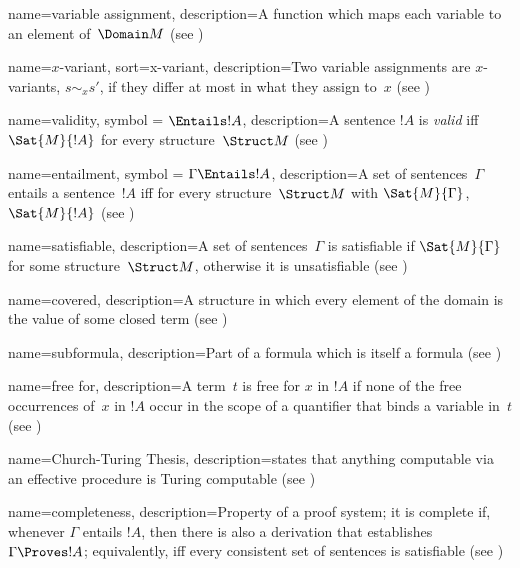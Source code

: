  {
  name=variable assignment,  
  description={A \gls{function} which maps each {variable} to an element
    of~$\Domain M$ (see )} }

 {
  name=$x$-variant,
  sort={x-variant},
  description={Two \glspl{variable assignment} are $x$-variants, $s \sim_x
    s'$, if they differ at most in what they assign to~$x$ (see
    )} }

 {
  name=validity,
  symbol = {\ensuremath{\Entails !A}},
  description={A sentence $!A$ is \emph{valid}  iff
    $\Sat{M}{!A}$ for every \gls{structure}~$\Struct M$ (see
    )} }

 {
  name=entailment,
  symbol = {\ensuremath{\Gamma \Entails !A}},
  description={A set of sentences~$\Gamma$ entails a
    sentence~$!A$ iff for every
    \gls{structure}~$\Struct M$ with $\Sat{M}{\Gamma}$, $\Sat{M}{!A}$
    (see )} }

 {
  name=satisfiable,
  description={A set of sentences~$\Gamma$ is satisfiable if
    $\Sat{M}{\Gamma}$ for some \gls{structure}~$\Struct M$, otherwise it
    is unsatisfiable (see )} }

 {
    name=covered,    
    description={A \gls{structure} in which every element of the
      domain is the {value} of some closed term (see
      )} }

 {
  name={subformula},  
  description={Part of a formula which is itself a formula (see
    )} }

 {
  name=free for,
  description={A term~$t$ is {free for} $x$ in $!A$ if none
    of the \gls{free} occurrences of~$x$ in $!A$ occur in the scope of a
    quantifier that binds a variable in~$t$ (see
    )} }

 {
  name=Church-Turing Thesis,
  description={states that anything computable via an effective
    procedure is Turing computable (see )} }

 {
  name=completeness, 
  description={Property of a proof system; it is complete if, whenever
    $\Gamma$ entails $!A$, then there is also a {derivation} that
    establishes $\Gamma \Proves !A$; equivalently, iff
    every \gls{consistent} set of sentences is \gls{satisfiable}
    (see )} }

